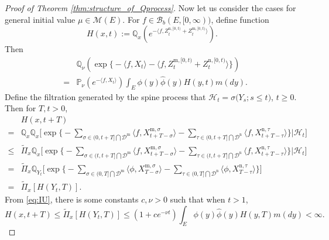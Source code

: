 \documentclass[12pt,a4paper]{amsart}
\numberwithin{equation}{section}
\theoremstyle{plain}
\theoremstyle{definition}
\begin{document}
\begin{proof}[Proof of Theorem \ref{thm:structure_of_Qprocess}]
  Now let us consider the cases for general initial value $\mu\in\mathcal M(E)$.  For $f\in\mathcal B_b(E,[0,\infty))$, define function
  \begin{equation}\label{def:H}
    H(x,t):={\mathbb Q}_x\left(e^{-\langle f, Z^{\mathrm n, [0,t)}_{t} + Z^{\mathrm m, [0,t)}_{t}\rangle }\right).
  \end{equation}
  Then
  \begin{eqnarray*}
    &&\mathbb Q_\nu\left(\exp\Big\{-\langle f, X_t\rangle-\langle f, Z^{{\mathrm m},[0,t)}_t+Z^{{\mathrm n},[0,t)}_t\rangle \Big\}\right)\\
    &=&\mathbb P_\nu\left(e^{-\langle f, X_t\rangle}\right)\int_E\phi(y)\widehat\phi(y)H(y,t)m(dy).
  \end{eqnarray*}
  Define the filtration generated by the spine process that $\mathcal{H}_t=\sigma\big(Y_s; s\leq t\big)$, $t\geq 0$.  Then for $T,t>0$,
  \begin{equation}\label{eq:subcritical_upper_bound}
    \begin{aligned}
      &H(x,t+T)\\
      =&\mathbb Q_{x}\mathbb Q_{x}\Big[\exp\Big\{-\sum_{\sigma\in (0, t+T]\bigcap \mathcal D^{\mathrm m}}\langle f, X_{t+T-\sigma}^{{\mathrm m},\sigma}\rangle -\sum_{\tau\in (0, t+T]\bigcap \mathcal D^{\mathrm n}}\langle f, X_{t+T-\tau}^{{\mathrm n}, \tau}\rangle \Big\}\Big| \mathcal H_t\Big]\\
      \leq&\widetilde\Pi_x\mathbb Q_{x}\Big[\exp\Big\{-\sum_{\sigma\in (t, t+T]\bigcap \mathcal D^{\mathrm m}}\langle f, X_{t+T-\sigma}^{{\mathrm m},\sigma}\rangle -\sum_{\tau\in (t, t+T]\bigcap \mathcal D^{\mathrm n}}\langle f, X_{t+T-\tau}^{{\mathrm n}, \tau}\rangle \Big\}\Big| \mathcal H_t\Big]\\
      =&
      \widetilde\Pi_x\mathbb Q_{Y_t}\Big[\exp\Big\{-\sum_{\sigma\in (0, T]\bigcap \mathcal D^{\mathrm m}}\langle \phi, X_{T-\sigma}^{{\mathrm m},\sigma}\rangle -\sum_{\tau\in (0, T]\bigcap \mathcal D^{\mathrm n}}\langle \phi, X_{T-\tau}^{{\mathrm n}, \tau}\rangle \Big\}\Big]\\
      =&\widetilde\Pi_x\left[ H(Y_t, T)\right].
    \end{aligned}
  \end{equation}
  From \eqref{eq:IU}, there is some constants $c,\nu>0$ such that when $t>1$,
  \[
    H(x,t+T)\leq \widetilde\Pi_x\left[ H(Y_t, T)\right]\leq (1+ce^{-\nu t})\int_E\phi(y)\widehat\phi(y)H(y,T)m(dy)<\infty.
\]
\end{proof}
\end{document}
